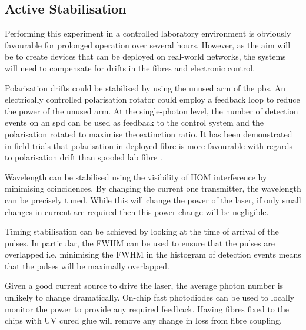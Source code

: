 \subsection{Active Stabilisation}

Performing this experiment in a controlled laboratory environment is obviously favourable for prolonged operation over several hours. However, as the aim will be to create devices that can be deployed on real-world networks, the systems will need to compensate for drifts in the fibres and electronic control.


Polarisation drifts could be stabilised by using the unused arm of the \ac{pbs}. An electrically controlled polarisation rotator could employ a feedback loop to reduce the power of the unused arm. At the single-photon level, the number of detection events on an \ac{spd} can be used as feedback to the control system and the polarisation rotated to maximise the extinction ratio. It has been demonstrated in field trials that polarisation in deployed fibre is more favourable with regards to polarisation drift than spooled lab fibre \cite{wengerowsky2019}.

Wavelength can be stabilised using the visibility of \ac{HOM} interference by minimising coincidences. By changing the current one transmitter, the wavelength can be precisely tuned. While this will change the power of the laser, if only small changes in current are required then this power change will be negligible.

Timing stabilisation can be achieved by looking at the time of arrival of the pulses. In particular, the \ac{FWHM} can be used to ensure that the pulses are overlapped i.e. minimising the \ac{FWHM} in the histogram of detection events means that the pulses will be maximally overlapped.

Given a good current source to drive the laser, the average photon number is unlikely to change dramatically. On-chip fast photodiodes can be used to locally monitor the power to provide any required feedback. Having fibres fixed to the chips with UV cured glue will remove any change in loss from fibre coupling.

%

